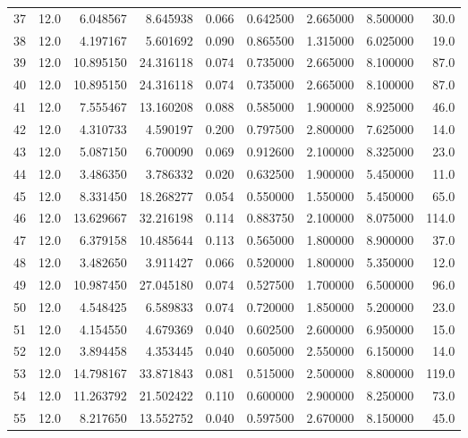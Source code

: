 \begin{tabular}{lrrrrrrrr}
37   &   12.0 &   6.048567 &   8.645938 &  0.066 &  0.642500 &  2.665000 &   8.500000 &   30.0 \\
38   &   12.0 &   4.197167 &   5.601692 &  0.090 &  0.865500 &  1.315000 &   6.025000 &   19.0 \\
39   &   12.0 &  10.895150 &  24.316118 &  0.074 &  0.735000 &  2.665000 &   8.100000 &   87.0 \\
40   &   12.0 &  10.895150 &  24.316118 &  0.074 &  0.735000 &  2.665000 &   8.100000 &   87.0 \\
41   &   12.0 &   7.555467 &  13.160208 &  0.088 &  0.585000 &  1.900000 &   8.925000 &   46.0 \\
42   &   12.0 &   4.310733 &   4.590197 &  0.200 &  0.797500 &  2.800000 &   7.625000 &   14.0 \\
43   &   12.0 &   5.087150 &   6.700090 &  0.069 &  0.912600 &  2.100000 &   8.325000 &   23.0 \\
44   &   12.0 &   3.486350 &   3.786332 &  0.020 &  0.632500 &  1.900000 &   5.450000 &   11.0 \\
45   &   12.0 &   8.331450 &  18.268277 &  0.054 &  0.550000 &  1.550000 &   5.450000 &   65.0 \\
46   &   12.0 &  13.629667 &  32.216198 &  0.114 &  0.883750 &  2.100000 &   8.075000 &  114.0 \\
47   &   12.0 &   6.379158 &  10.485644 &  0.113 &  0.565000 &  1.800000 &   8.900000 &   37.0 \\
48   &   12.0 &   3.482650 &   3.911427 &  0.066 &  0.520000 &  1.800000 &   5.350000 &   12.0 \\
49   &   12.0 &  10.987450 &  27.045180 &  0.074 &  0.527500 &  1.700000 &   6.500000 &   96.0 \\
50   &   12.0 &   4.548425 &   6.589833 &  0.074 &  0.720000 &  1.850000 &   5.200000 &   23.0 \\
51   &   12.0 &   4.154550 &   4.679369 &  0.040 &  0.602500 &  2.600000 &   6.950000 &   15.0 \\
52   &   12.0 &   3.894458 &   4.353445 &  0.040 &  0.605000 &  2.550000 &   6.150000 &   14.0 \\
53   &   12.0 &  14.798167 &  33.871843 &  0.081 &  0.515000 &  2.500000 &   8.800000 &  119.0 \\
54   &   12.0 &  11.263792 &  21.502422 &  0.110 &  0.600000 &  2.900000 &   8.250000 &   73.0 \\
55   &   12.0 &   8.217650 &  13.552752 &  0.040 &  0.597500 &  2.670000 &   8.150000 &   45.0 \\

\end{tabular}
